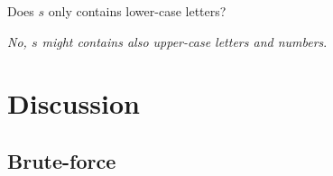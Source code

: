 \begin{QandA}
	\item Does $s$ only contains lower-case letters?
	\begin{answered}
		\textit{No, $s$ might contains also upper-case letters and numbers}.
	\end{answered}
	
\end{QandA}

\section{Discussion}
\label{word_break:sec:discussion}


\subsection{Brute-force}
\label{word_break:sec:bruteforce}




